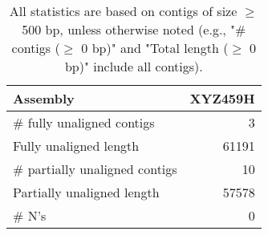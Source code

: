 \documentclass[12pt,a4paper]{article}
\begin{document}
\begin{table}[ht]
\begin{center}
\caption{All statistics are based on contigs of size $\geq$ 500 bp, unless otherwise noted (e.g., "\# contigs ($\geq$ 0 bp)" and "Total length ($\geq$ 0 bp)" include all contigs).}
\begin{tabular}{|l*{1}{|r}|}
\hline
Assembly & XYZ459H \\ \hline
\# fully unaligned contigs & 3 \\ \hline
Fully unaligned length & 61191 \\ \hline
\# partially unaligned contigs & 10 \\ \hline
Partially unaligned length & 57578 \\ \hline
\# N's & 0 \\ \hline
\end{tabular}
\end{center}
\end{table}
\end{document}

